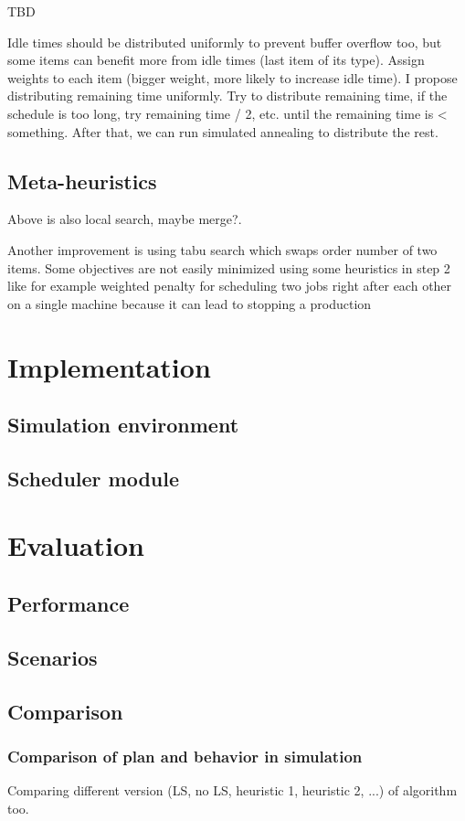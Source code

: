 \documentclass{ctuthesis}
\begin{document}
TBD

Idle times should be distributed uniformly to prevent buffer overflow too, but some items can benefit more from idle times (last item of its type).  Assign weights to each item (bigger weight, more likely to increase idle time). I propose distributing remaining time uniformly. Try to distribute remaining time, if the schedule is too long, try remaining time / 2, etc. until the remaining time is < something. After that, we can run simulated annealing to distribute the rest.

\section{Meta-heuristics}
Above is also local search, maybe merge?.

Another improvement is using tabu search which swaps order number of two items. Some objectives are not easily minimized using some heuristics in step 2 like for example weighted penalty for scheduling two jobs right after each other on a single machine because it can lead to stopping a production

\chapter{Implementation}
\section{Simulation environment}
\section{Scheduler module}
\chapter{Evaluation}
\label{ch:Evaluation}
\section{Performance}
\section{Scenarios}
\section{Comparison}
\subsection{Comparison of plan and behavior in simulation}
Comparing different version (LS, no LS, heuristic 1, heuristic 2, ...) of algorithm too.
\end{document}
